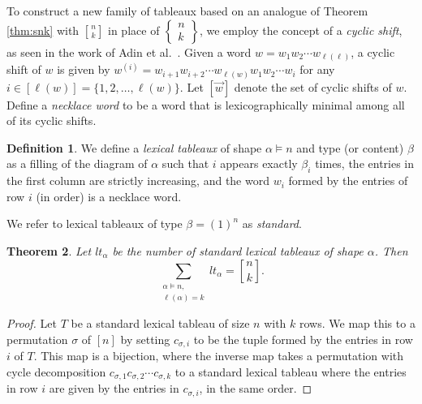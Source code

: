 \documentclass{amsart}
\newtheorem{theorem}{Theorem}[section]
\theoremstyle{definition}
\newtheorem{definition}[theorem]{Definition}
\begin{document}
 To construct a new family of tableaux based on an analogue of Theorem \ref{thm:snk} with 
 ${n \brack k} $ in place of 
 $ \left\{ \begin{smallmatrix} 
 n \\ k 
 \end{smallmatrix} \right\}$, 
 we employ the concept of a \emph{cyclic shift}, as seen in the work of Adin et al.\ \cite{AdinGesselReinerRoichman2021}. Given a word $w = w_1 w_2 \cdots w_{\ell(\ell)}$, 
 a cyclic shift of $w$ is given by $w^{(i)} = w_{i+1} w_{i+2} \cdots
 w_{\ell(w)} w_1 w_2 \cdots w_{i}$ for any $i \in [ \ell(w) 
 ] = \{ 1, 2, \ldots, \ell(w) 
 \}$. Let $[\vec{w}]$ denote the set of cyclic shifts of $w$. Define a \emph{necklace word} to be a word that is lexicographically minimal among all of its cyclic shifts.

\begin{definition}
 We define a \emph{lexical tableaux} of shape $\alpha \vDash n$ and type (or content) $\beta$ as a filling of the diagram
 of $\alpha$ such that $i$ appears exactly $\beta_i$ times, the entries in the first column are strictly increasing, and the word
 $w_i$ formed by the entries of row $i$ (in order) is a necklace word.
\end{definition}

 We refer to lexical tableaux of type $\beta = (1)^n$ as \emph{standard}. 

\begin{theorem}\label{theoremltstirling}
 Let $lt_{\alpha}$ be the number of  standard  lexical tableaux of shape $\alpha$. Then 
\begin{equation}\label{displayltstirling}
 \sum_{\substack{ \alpha \vDash n,\\ \ell(\alpha)=k}} lt_{\alpha} = {n \brack k}. 
\end{equation} 
\end{theorem}

\begin{proof} 
 Let $T$ be a standard lexical tableau of size $n$ with $k$ rows. We map this to a permutation $\sigma$ of $[n]$ by setting $c_{\sigma, i}$ to be the tuple formed by the entries in row $i$ of $T$. This map is a bijection, 
 where the inverse map takes a permutation with cycle decomposition $c_{\sigma,1}c_{\sigma, 2} \cdots c_{\sigma, k}$ to a standard lexical tableau where the entries in row $i$ are given by the entries in $c_{\sigma, i}$, in the same order.
\end{proof}
\end{document}
